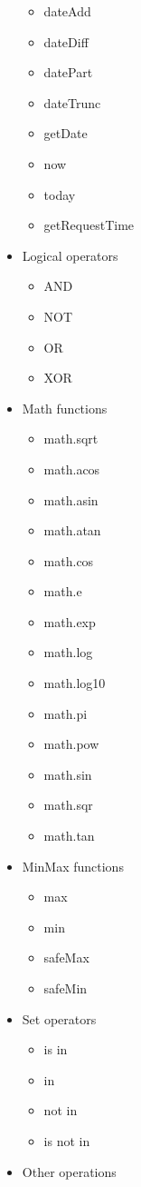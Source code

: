 \begin{itemize}
\begin{itemize}
        \item dateAdd
        \item dateDiff
        \item datePart
        \item dateTrunc
        \item getDate
        \item now
        \item today
        \item getRequestTime
    \end{itemize}
    \item Logical operators
    \begin{itemize}

        \item AND
        \item NOT
        \item OR
        \item XOR
    \end{itemize}
    \item Math functions
    \begin{itemize}

        \item math.sqrt
        \item math.acos
        \item math.asin
        \item math.atan
        \item math.cos
        \item math.e
        \item math.exp
        \item math.log
        \item math.log10
        \item math.pi
        \item math.pow
        \item math.sin
        \item math.sqr
        \item math.tan
    \end{itemize}
    \item MinMax functions
    \begin{itemize}
        \item max
        \item min
        \item safeMax
        \item safeMin
    \end{itemize}
    \item Set operators
    \begin{itemize}
        \item is in
        \item in
        \item not in
        \item is not in
    \end{itemize}
    \item Other operations
    \begin{itemize}


\end{itemize}
\end{itemize}
